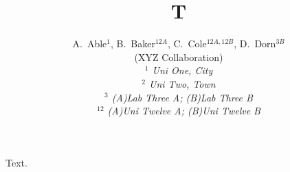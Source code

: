 \documentclass[prd,twocolumn]{revtex4-1}
\begin{document}
\title{T}
\author{
  \begin{small}
    \begin{center}
      A.~Able$^{1}$, B.~Baker$^{12A}$, C.~Cole$^{12A,12B}$, D.~Dorn$^{3B}$
      \\ \vspace{0.2cm} (XYZ Collaboration)\\
      \vspace{0.2cm} {\it
        $^{1}$ Uni One, City\\
        $^{2}$ Uni Two, Town\\
        $^{3}$ (A)Lab Three A; (B)Lab Three B\\
        $^{12}$ (A)Uni Twelve A; (B)Uni Twelve B\\ }
    \end{center}
    \vspace{0.4cm}
  \end{small}
}
\affiliation{}
\maketitle
Text.
\end{document}
